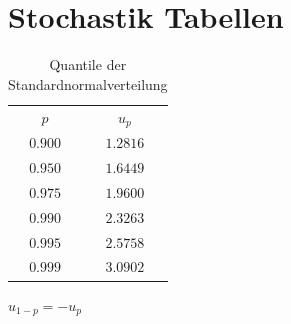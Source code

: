 \documentclass[english,ngerman,fontsize=9pt,intoc,index=totoc,refpage,listof=totoc,draft]{scrbook}
\numberwithin{equation}{section}
\begin{document}
\chapter{Stochastik Tabellen}

\begin{table}[h]
\centering
\begin{tabular}{cc}
$p$     & $u_p$    \\
$0.900$ & $1.2816$ \\
$0.950$ & $1.6449$ \\
$0.975$ & $1.9600$ \\
$0.990$ & $2.3263$ \\
$0.995$ & $2.5758$ \\
$0.999$ & $3.0902$
\end{tabular}

$u_{1-p}=-u_{p}$
\caption{\label{tab:Quantile-Standardnormalvtlg}Quantile der Standardnormalverteilung}
\end{table}
\end{document}
